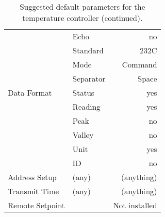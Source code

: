 {\begin{table}
\begin{center}
\begin{tabular}{|l|l|r|}
                      & Echo                 & no   \\
                      & Standard             & 232C \\
                      & Mode                 & Command \\
                      & Separator            & Space   \\
\hline
Data Format           & Status               & yes     \\
                      & Reading              & yes     \\
                      & Peak                 & no      \\
                      & Valley               & no      \\
                      & Unit                 & yes     \\
                      & ID                   & no      \\
\hline
Address Setup         & (any)                & (anything) \\
\hline
Transmit Time         & (any)                & (anything) \\
\hline
Remote Setpoint       &                      & Not installed \\
\hline\hline
\end{tabular}
\end{center}
\caption{Suggested default parameters for the temperature controller 
(continued).}
\label{tab:ctlparam2}
\end{table}

}
